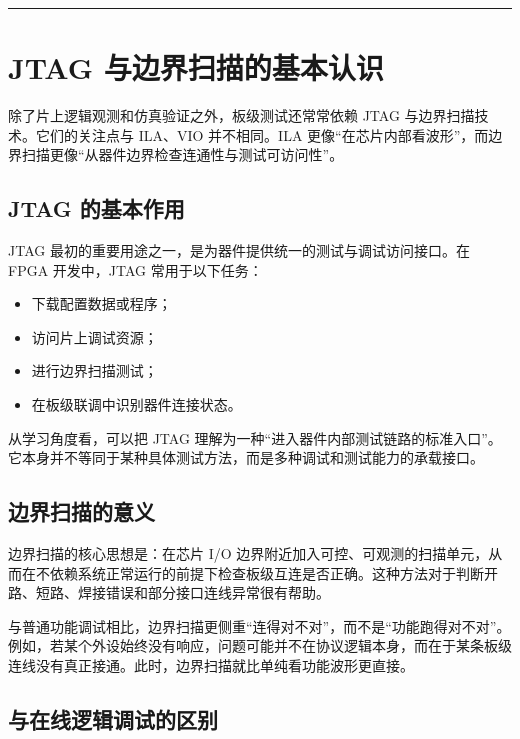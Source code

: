 \begin{center}\rule{0.5\linewidth}{0.5pt}\end{center}

\section{JTAG
与边界扫描的基本认识}\label{jtag-ux4e0eux8fb9ux754cux626bux63cfux7684ux57faux672cux8ba4ux8bc6}

除了片上逻辑观测和仿真验证之外，板级测试还常常依赖 JTAG
与边界扫描技术。它们的关注点与 ILA、VIO 并不相同。ILA
更像``在芯片内部看波形''，而边界扫描更像``从器件边界检查连通性与测试可访问性''。

\subsection{JTAG 的基本作用}\label{jtag-ux7684ux57faux672cux4f5cux7528}

JTAG 最初的重要用途之一，是为器件提供统一的测试与调试访问接口。在 FPGA
开发中，JTAG 常用于以下任务：

\begin{itemize}
\tightlist
\item
  下载配置数据或程序；
\item
  访问片上调试资源；
\item
  进行边界扫描测试；
\item
  在板级联调中识别器件连接状态。
\end{itemize}

从学习角度看，可以把 JTAG
理解为一种``进入器件内部测试链路的标准入口''。它本身并不等同于某种具体测试方法，而是多种调试和测试能力的承载接口。

\subsection{边界扫描的意义}\label{ux8fb9ux754cux626bux63cfux7684ux610fux4e49}

边界扫描的核心思想是：在芯片 I/O
边界附近加入可控、可观测的扫描单元，从而在不依赖系统正常运行的前提下检查板级互连是否正确。这种方法对于判断开路、短路、焊接错误和部分接口连线异常很有帮助。

与普通功能调试相比，边界扫描更侧重``连得对不对''，而不是``功能跑得对不对''。例如，若某个外设始终没有响应，问题可能并不在协议逻辑本身，而在于某条板级连线没有真正接通。此时，边界扫描就比单纯看功能波形更直接。

\subsection{与在线逻辑调试的区别}\label{ux4e0eux5728ux7ebfux903bux8f91ux8c03ux8bd5ux7684ux533aux522b}

